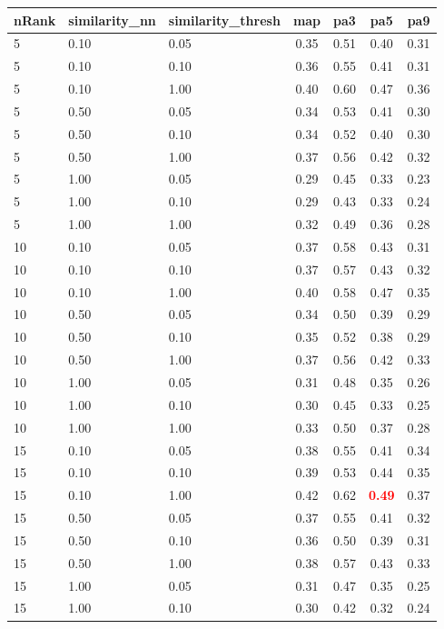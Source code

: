   
\begin{table} 
\begin{center} 
\scriptsize 
 \setlength{\tabcolsep}{.16667em} 
\begin{tabular}{lllcccc} 
nRank & similarity\_nn & similarity\_thresh & map & pa3 & pa5 & pa9 \\ 
\hline 
 5 & 0.10 & 0.05 & 0.35 & 0.51 & 0.40 & 0.31 \\ 
 5 & 0.10 & 0.10 & 0.36 & 0.55 & 0.41 & 0.31 \\ 
 5 & 0.10 & 1.00 & 0.40 & 0.60 & 0.47 & 0.36 \\ 
 5 & 0.50 & 0.05 & 0.34 & 0.53 & 0.41 & 0.30 \\ 
 5 & 0.50 & 0.10 & 0.34 & 0.52 & 0.40 & 0.30 \\ 
 5 & 0.50 & 1.00 & 0.37 & 0.56 & 0.42 & 0.32 \\ 
 5 & 1.00 & 0.05 & 0.29 & 0.45 & 0.33 & 0.23 \\ 
 5 & 1.00 & 0.10 & 0.29 & 0.43 & 0.33 & 0.24 \\ 
 5 & 1.00 & 1.00 & 0.32 & 0.49 & 0.36 & 0.28 \\ 
10 & 0.10 & 0.05 & 0.37 & 0.58 & 0.43 & 0.31 \\ 
10 & 0.10 & 0.10 & 0.37 & 0.57 & 0.43 & 0.32 \\ 
10 & 0.10 & 1.00 & 0.40 & 0.58 & 0.47 & 0.35 \\ 
10 & 0.50 & 0.05 & 0.34 & 0.50 & 0.39 & 0.29 \\ 
10 & 0.50 & 0.10 & 0.35 & 0.52 & 0.38 & 0.29 \\ 
10 & 0.50 & 1.00 & 0.37 & 0.56 & 0.42 & 0.33 \\ 
10 & 1.00 & 0.05 & 0.31 & 0.48 & 0.35 & 0.26 \\ 
10 & 1.00 & 0.10 & 0.30 & 0.45 & 0.33 & 0.25 \\ 
10 & 1.00 & 1.00 & 0.33 & 0.50 & 0.37 & 0.28 \\ 
15 & 0.10 & 0.05 & 0.38 & 0.55 & 0.41 & 0.34 \\ 
15 & 0.10 & 0.10 & 0.39 & 0.53 & 0.44 & 0.35 \\ 
15 & 0.10 & 1.00 & 0.42 & 0.62 & \textbf{\textcolor{red}{0.49}} & 0.37 \\ 
15 & 0.50 & 0.05 & 0.37 & 0.55 & 0.41 & 0.32 \\ 
15 & 0.50 & 0.10 & 0.36 & 0.50 & 0.39 & 0.31 \\ 
15 & 0.50 & 1.00 & 0.38 & 0.57 & 0.43 & 0.33 \\ 
15 & 1.00 & 0.05 & 0.31 & 0.47 & 0.35 & 0.25 \\ 
15 & 1.00 & 0.10 & 0.30 & 0.42 & 0.32 & 0.24 \\ 

\end{tabular}
\end{center}
\end{table}
